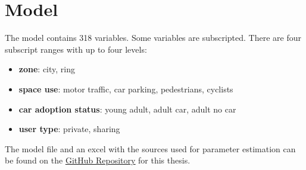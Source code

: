 \chapter{Model}
\label{app:model}
\sloppy
The model contains 318 variables. Some variables are subscripted. There are four subscript ranges with up to four levels:
        \begin{itemize}
            \item \textbf{zone}: city, ring
            \item \textbf{space use}: motor traffic, car parking, pedestrians, cyclists
            \item \textbf{car adoption status}: young adult, adult car, adult no car
            \item \textbf{user type}: private, sharing
        \end{itemize}The model file and an excel with the sources used for parameter estimation can be found on 
    the \underline{\textcolor{blue}{\href{https://github.com/Michared/roadspace-reallocation}{GitHub Repository}}} for this thesis.
